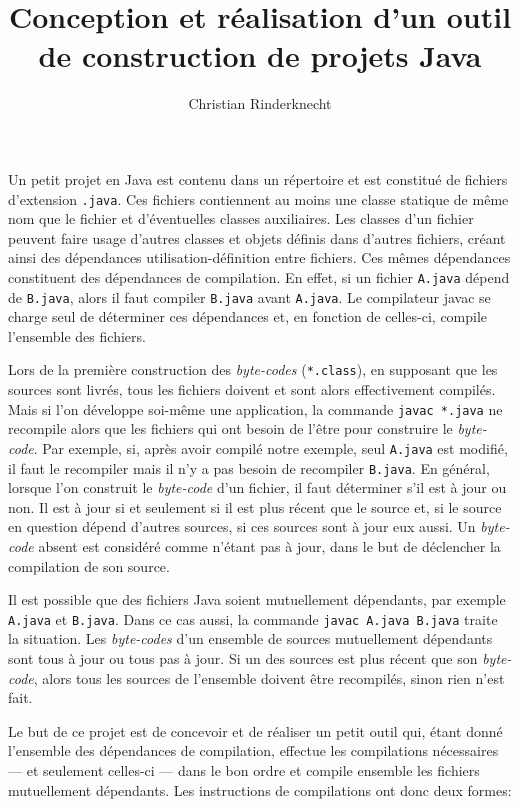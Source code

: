 \documentclass[a4paper,11pt]{article}
\title{Conception et réalisation d'un outil de construction de projets Java}
\author{Christian Rinderknecht}
\newcommand{\Java}{\textsf{Java}\xspace}
\newcommand{\javac}{\textsf{javac}\xspace}
\begin{document}
\maketitle

Un petit projet en \Java est contenu dans un répertoire et est
constitué de fichiers d'extension \verb|.java|. Ces fichiers
contiennent au moins une classe statique de même nom que le fichier et
d'éventuelles classes auxiliaires. Les classes d'un fichier peuvent
faire usage d'autres classes et objets définis dans d'autres fichiers,
créant ainsi des dépendances utilisation-définition entre
fichiers. Ces mêmes dépendances constituent des dépendances de
compilation. En effet, si un fichier \texttt{A.java} dépend de
\texttt{B.java}, alors il faut compiler \texttt{B.java} avant
\texttt{A.java}. Le compilateur \javac se charge seul de déterminer
ces dépendances et, en fonction de celles-ci, compile l'ensemble des
fichiers.

\medskip

Lors de la première construction des \emph{byte-codes}
(\texttt{*.class}), en supposant que les sources sont livrés, tous les
fichiers doivent et sont alors effectivement compilés. Mais si l'on
développe soi-même une application, la commande \texttt{javac *.java}
ne recompile alors que les fichiers qui ont besoin de l'être pour
construire le \emph{byte-code}. Par exemple, si, après avoir compilé
notre exemple, seul \texttt{A.java} est modifié, il faut le recompiler
mais il n'y a pas besoin de recompiler \texttt{B.java}. En général,
lorsque l'on construit le \emph{byte-code} d'un fichier, il faut
déterminer s'il est à jour ou non. Il est à jour si et seulement si il
est plus récent que le source et, si le source en question dépend
d'autres sources, si ces sources sont à jour eux aussi. Un
\emph{byte-code} absent est considéré comme n'étant pas à jour, dans
le but de déclencher la compilation de son source.

\medskip

Il est possible que des fichiers \Java soient mutuellement dépendants,
par exemple \texttt{A.java} et \texttt{B.java}. Dans ce cas aussi, la
commande \texttt{javac A.java B.java} traite la situation. Les
\emph{byte-codes} d'un ensemble de sources mutuellement dépendants
sont tous à jour ou tous pas à jour. Si un des sources est plus récent
que son \emph{byte-code}, alors tous les sources de l'ensemble doivent
être recompilés, sinon rien n'est fait.

\medskip

Le but de ce projet est de concevoir et de réaliser un petit outil
qui, étant donné l'ensemble des dépendances de compilation, effectue
les compilations nécessaires --- et seulement celles-ci --- dans le
bon ordre et compile ensemble les fichiers mutuellement
dépendants. Les instructions de compilations ont donc deux formes:
\end{document}
